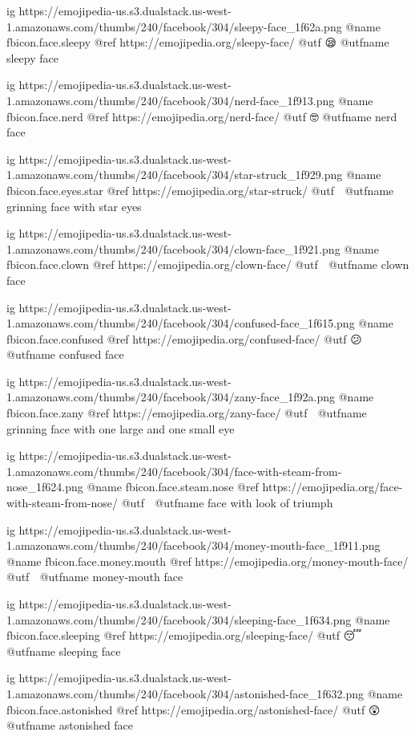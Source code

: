 	ig https://emojipedia-us.s3.dualstack.us-west-1.amazonaws.com/thumbs/240/facebook/304/sleepy-face_1f62a.png
	@name fbicon.face.sleepy
	@ref https://emojipedia.org/sleepy-face/
	@utf 😪
	@utfname sleepy face

	ig https://emojipedia-us.s3.dualstack.us-west-1.amazonaws.com/thumbs/240/facebook/304/nerd-face_1f913.png
	@name fbicon.face.nerd
	@ref https://emojipedia.org/nerd-face/
	@utf 🤓
	@utfname nerd face

	ig https://emojipedia-us.s3.dualstack.us-west-1.amazonaws.com/thumbs/240/facebook/304/star-struck_1f929.png
	@name fbicon.face.eyes.star
	@ref https://emojipedia.org/star-struck/
	@utf 🤩
	@utfname grinning face with star eyes

	ig https://emojipedia-us.s3.dualstack.us-west-1.amazonaws.com/thumbs/240/facebook/304/clown-face_1f921.png
	@name fbicon.face.clown
	@ref https://emojipedia.org/clown-face/
	@utf 🤡
	@utfname clown face

	ig https://emojipedia-us.s3.dualstack.us-west-1.amazonaws.com/thumbs/240/facebook/304/confused-face_1f615.png
	@name fbicon.face.confused
	@ref https://emojipedia.org/confused-face/
	@utf 😕
	@utfname confused face

	ig https://emojipedia-us.s3.dualstack.us-west-1.amazonaws.com/thumbs/240/facebook/304/zany-face_1f92a.png
	@name fbicon.face.zany
	@ref https://emojipedia.org/zany-face/
	@utf 🤪
	@utfname grinning face with one large and one small eye

	ig https://emojipedia-us.s3.dualstack.us-west-1.amazonaws.com/thumbs/240/facebook/304/face-with-steam-from-nose_1f624.png
	@name fbicon.face.steam.nose
	@ref https://emojipedia.org/face-with-steam-from-nose/
	@utf 😤
	@utfname face with look of triumph

	ig https://emojipedia-us.s3.dualstack.us-west-1.amazonaws.com/thumbs/240/facebook/304/money-mouth-face_1f911.png
	@name fbicon.face.money.mouth
	@ref https://emojipedia.org/money-mouth-face/
	@utf 🤑
	@utfname money-mouth face

	ig https://emojipedia-us.s3.dualstack.us-west-1.amazonaws.com/thumbs/240/facebook/304/sleeping-face_1f634.png
	@name fbicon.face.sleeping
	@ref https://emojipedia.org/sleeping-face/
	@utf 😴
	@utfname sleeping face

	ig https://emojipedia-us.s3.dualstack.us-west-1.amazonaws.com/thumbs/240/facebook/304/astonished-face_1f632.png
	@name fbicon.face.astonished
	@ref https://emojipedia.org/astonished-face/
	@utf 😲
	@utfname astonished face

